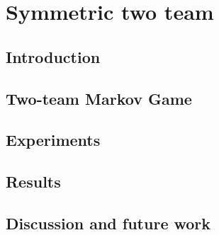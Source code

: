 \chapter{Symmetric two team}\label{ch:2teams}
\section{Introduction}
\section{Two-team Markov Game}
\section{Experiments}
\section{Results}
\section{Discussion and future work}
